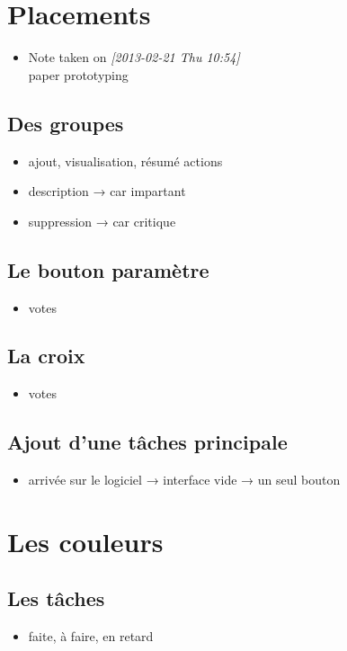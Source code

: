 \documentclass[11pt]{article}
\begin{document}
\section[Placements]{Placements}
\label{sec-4}
\begin{itemize}
\item Note taken on \textit{[2013-02-21 Thu 10:54]} \\
    paper prototyping
\end{itemize}

\subsection[Des groupes]{Des groupes}
\label{sec-4-1}
\begin{itemize}
\item ajout, visualisation, résumé actions
\item description → car impartant
\item suppression → car critique
\end{itemize}
\subsection[Le bouton paramètre]{Le bouton paramètre}
\label{sec-4-2}
\begin{itemize}
\item votes
\end{itemize}
\subsection[La croix]{La croix}
\label{sec-4-3}
\begin{itemize}
\item votes
\end{itemize}
\subsection[Ajout d'une tâches principale]{Ajout d'une tâches principale}
\label{sec-4-4}
\begin{itemize}
\item arrivée sur le logiciel → interface vide → un seul bouton
\end{itemize}
\section[Les couleurs]{Les couleurs}
\label{sec-5}

\subsection[Les tâches]{Les tâches}
\label{sec-5-1}
\begin{itemize}
\item faite, à faire, en retard
\end{itemize}
\end{document}
